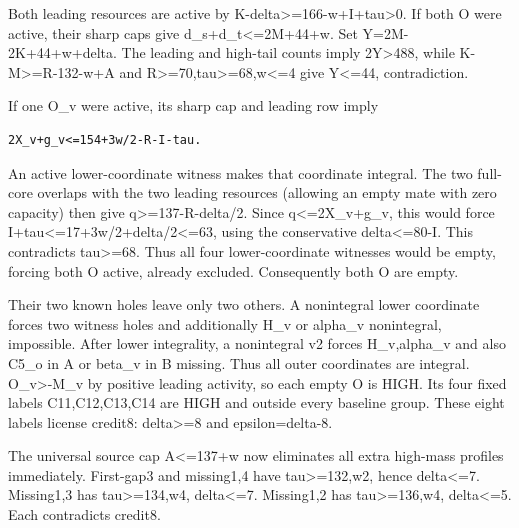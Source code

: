 \documentclass[10pt,a4paper]{article}
\theoremstyle{definition}
\begin{document}
Both leading resources are active by
K-delta\textgreater=\allowbreak{}166-w+\allowbreak{}I+\allowbreak{}tau\textgreater0. If both O were active,\allowbreak{}
their sharp caps give d\_\allowbreak{}s+\allowbreak{}d\_\allowbreak{}t\textless=\allowbreak{}2M+\allowbreak{}44+\allowbreak{}w. Set
Y=\allowbreak{}2M-2K+\allowbreak{}44+\allowbreak{}w+\allowbreak{}delta. The leading and high-tail counts imply
2Y\textgreater488,\allowbreak{} while K-M\textgreater=\allowbreak{}R-132-w+\allowbreak{}A and
R\textgreater=\allowbreak{}70,\allowbreak{}tau\textgreater=\allowbreak{}68,\allowbreak{}w\textless=\allowbreak{}4 give Y\textless=\allowbreak{}44,\allowbreak{}
contradiction.

If one O\_\allowbreak{}v were active,\allowbreak{} its sharp cap and leading row imply

\begin{lstlisting}
2X_v+g_v<=154+3w/2-R-I-tau.
\end{lstlisting}

An active lower-coordinate witness makes that coordinate integral. The
two full-core overlaps with the two leading resources (allowing an empty
mate with zero capacity) then give q\textgreater=\allowbreak{}137-R-delta/2. Since
q\textless=\allowbreak{}2X\_\allowbreak{}v+\allowbreak{}g\_\allowbreak{}v,\allowbreak{} this would force
I+\allowbreak{}tau\textless=\allowbreak{}17+\allowbreak{}3w/2+\allowbreak{}delta/2\textless=\allowbreak{}63,\allowbreak{} using the conservative
delta\textless=\allowbreak{}80-I. This contradicts tau\textgreater=\allowbreak{}68. Thus all four
lower-coordinate witnesses would be empty,\allowbreak{} forcing both O active,\allowbreak{}
already excluded. Consequently both O are empty.

Their two known holes leave only two others. A nonintegral lower
coordinate forces two witness holes and additionally H\_\allowbreak{}v or alpha\_\allowbreak{}v
nonintegral,\allowbreak{} impossible. After lower integrality,\allowbreak{} a nonintegral v2
forces H\_\allowbreak{}v,\allowbreak{}alpha\_\allowbreak{}v and also C5\_\allowbreak{}o in A or beta\_\allowbreak{}v in B missing. Thus
all outer coordinates are integral. O\_\allowbreak{}v\textgreater-M\_\allowbreak{}v by positive
leading activity,\allowbreak{} so each empty O is HIGH. Its four fixed labels
C11,\allowbreak{}C12,\allowbreak{}C13,\allowbreak{}C14 are HIGH and outside every baseline group. These eight
labels license credit8: delta\textgreater=\allowbreak{}8 and epsilon=\allowbreak{}delta-8.

The universal source cap A\textless=\allowbreak{}137+\allowbreak{}w now eliminates all extra
high-mass profiles immediately. First-gap3 and missing1,\allowbreak{}4 have
tau\textgreater=\allowbreak{}132,\allowbreak{}w2,\allowbreak{} hence delta\textless=\allowbreak{}7. Missing1,\allowbreak{}3 has
tau\textgreater=\allowbreak{}134,\allowbreak{}w4,\allowbreak{} delta\textless=\allowbreak{}7. Missing1,\allowbreak{}2 has
tau\textgreater=\allowbreak{}136,\allowbreak{}w4,\allowbreak{} delta\textless=\allowbreak{}5. Each contradicts credit8.
\end{document}
